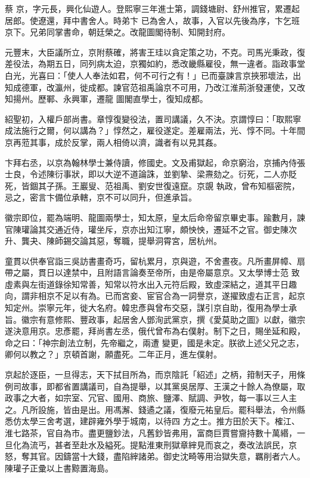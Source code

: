 
\begin{pinyinscope}

 蔡
 京，字元長，興化仙遊人。登熙寧三年進士第，調錢塘尉、舒州推官，累遷起居郎。使遼還，拜中書舍人。時弟卞
 已為舍人，故事，入官以先後為序，卞乞班京下。兄弟同掌書命，朝廷榮之。改龍圖閣待制、知開封府。



 元豐末，大臣議所立，京附蔡確，將害王珪以貪定策之功，不克。司馬光秉政，復差役法，為期五日，同列病太迫，京獨如約，悉改畿縣雇役，無一違者。詣政事堂白光，光喜曰：「使人人奉法如君，何不可行之有！」已而臺諫言京挾邪壞法，出知成德軍，改瀛州，徙成都。諫官范祖禹論京不可用，乃改江淮荊浙發運使，又改知揚州。歷鄆、永興軍，遷龍
 圖閣直學士，復知成都。



 紹聖初，入權戶部尚書。章惇復變役法，置司講議，久不決。京謂惇曰：「取熙寧成法施行之爾，何以講為？」惇然之，雇役遂定。差雇兩法，光、惇不同。十年間京再蒞其事，成於反掌，兩人相倚以濟，識者有以見其姦。



 卞拜右丞，以京為翰林學士兼侍讀，修國史。文及甫獄起，命京窮治，京捕內侍張士良，令述陳衍事狀，即以大逆不道論誅，並劉摯、梁燾劾之。衍死，二人亦貶死，皆錮其子孫。王巖叟、范祖禹、劉安世復遠竄。京覬
 執政，曾布知樞密院，忌之，密言卞備位承轄，京不可以同升，但進承旨。



 徽宗即位，罷為端明、龍圖兩學士，知太原，皇太后命帝留京畢史事。踰數月，諫官陳瓘論其交通近侍，瓘坐斥，京亦出知江寧，頗怏怏，遷延不之官。御史陳次升、龔夬、陳師錫交論其惡，奪職，提舉洞霄宮，居杭州。



 童貫以供奉官詣三吳訪書畫奇巧，留杭累月，京與遊，不舍晝夜。凡所畫屏幛、扇帶之屬，貫日以達禁中，且附語言論奏至帝所，由是帝屬意京。又太學博士范
 致虛素與左街道錄徐知常善，知常以符水出入元符后殿，致虛深結之，道其平日趣向，謂非相京不足以有為。已而宮妾、宦官合為一詞譽京，遂擢致虛右正言，起京知定州。崇寧元年，徙大名府。韓忠彥與曾布交惡，謀引京自助，復用為學士承旨。徽宗有意修熙、豐政事，起居舍人鄧洵武黨京，撰《愛莫助之圖》以獻，徽宗遂決意用京。忠彥罷，拜尚書左丞，俄代曾布為右僕射。制下之日，賜坐延和殿，命之曰：「神宗創法立制，先帝繼之，兩遭
 變更，國是未定。朕欲上述父兄之志，卿何以教之？」京頓首謝，願盡死。二年正月，進左僕射。



 京起於逐臣，一旦得志，天下拭目所為，而京陰託「紹述」之柄，箝制天子，用條例司故事，即都省置講議司，自為提舉，以其黨吳居厚、王漢之十餘人為僚屬，取政事之大者，如宗室、冗官、國用、商旅、鹽澤、賦調、尹牧，每一事以三人主之。凡所設施，皆由是出。用馮澥、錢遹之議，復廢元祐皇后。罷科舉法，令州縣悉仿太學三舍考選，建辟雍外學于城南，以待四
 方之士。推方田於天下。榷江、淮七路茶，官自為市。盡更鹽鈔法，凡舊鈔皆弗用，富商巨賈嘗齎持數十萬緡，一旦化為流丐，甚者至赴水及縊死。提點淮東刑獄章縡見而哀之，奏改法誤民，京怒，奪其官。因鑄當十大錢，盡陷縡諸弟。御史沈畸等用治獄失意，羈削者六人。陳瓘子正彚以上書黥置海島。




\end{pinyinscope}
